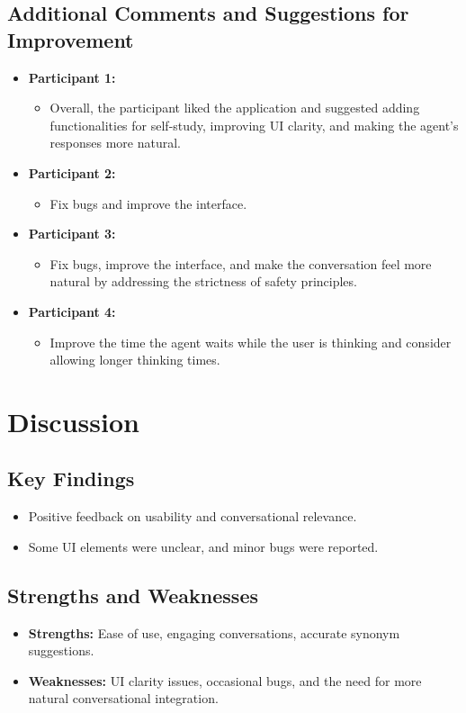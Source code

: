 \documentclass{article}
\begin{document}
\subsection{Additional Comments and Suggestions for Improvement}
\begin{itemize}
    \item \textbf{Participant 1:}
    \begin{itemize}
        \item Overall, the participant liked the application and suggested adding functionalities for self-study, improving UI clarity, and making the agent's responses more natural.
    \end{itemize}
    \item \textbf{Participant 2:}
    \begin{itemize}
        \item Fix bugs and improve the interface.
    \end{itemize}
    \item \textbf{Participant 3:}
    \begin{itemize}
        \item Fix bugs, improve the interface, and make the conversation feel more natural by addressing the strictness of safety principles.
    \end{itemize}
    \item \textbf{Participant 4:}
    \begin{itemize}
        \item Improve the time the agent waits while the user is thinking and consider allowing longer thinking times.
    \end{itemize}
\end{itemize}

\section{Discussion}

\subsection{Key Findings}
\begin{itemize}
    \item Positive feedback on usability and conversational relevance.
    \item Some UI elements were unclear, and minor bugs were reported.
\end{itemize}

\subsection{Strengths and Weaknesses}
\begin{itemize}
    \item \textbf{Strengths:} Ease of use, engaging conversations, accurate synonym suggestions.
    \item \textbf{Weaknesses:} UI clarity issues, occasional bugs, and the need for more natural conversational integration.
\end{itemize}
\end{document}
